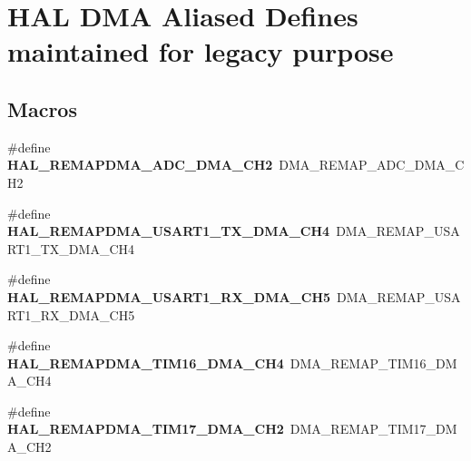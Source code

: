 \hypertarget{group___h_a_l___d_m_a___aliased___defines}{\section{H\-A\-L D\-M\-A Aliased Defines maintained for legacy purpose}
\label{group___h_a_l___d_m_a___aliased___defines}
}
\subsection*{Macros}
\begin{DoxyCompactItemize}
\item 
\hypertarget{group___h_a_l___d_m_a___aliased___defines_gab67dabe51720b5e84e798243b52428c7}{\#define {\bfseries H\-A\-L\-\_\-\-R\-E\-M\-A\-P\-D\-M\-A\-\_\-\-A\-D\-C\-\_\-\-D\-M\-A\-\_\-\-C\-H2}~D\-M\-A\-\_\-\-R\-E\-M\-A\-P\-\_\-\-A\-D\-C\-\_\-\-D\-M\-A\-\_\-\-C\-H2}\label{group___h_a_l___d_m_a___aliased___defines_gab67dabe51720b5e84e798243b52428c7}

\item 
\hypertarget{group___h_a_l___d_m_a___aliased___defines_ga9f990969f0752e658ca3b1ca5fef46b8}{\#define {\bfseries H\-A\-L\-\_\-\-R\-E\-M\-A\-P\-D\-M\-A\-\_\-\-U\-S\-A\-R\-T1\-\_\-\-T\-X\-\_\-\-D\-M\-A\-\_\-\-C\-H4}~D\-M\-A\-\_\-\-R\-E\-M\-A\-P\-\_\-\-U\-S\-A\-R\-T1\-\_\-\-T\-X\-\_\-\-D\-M\-A\-\_\-\-C\-H4}\label{group___h_a_l___d_m_a___aliased___defines_ga9f990969f0752e658ca3b1ca5fef46b8}

\item 
\hypertarget{group___h_a_l___d_m_a___aliased___defines_gaee098de174f870c95b0853e34dddd92b}{\#define {\bfseries H\-A\-L\-\_\-\-R\-E\-M\-A\-P\-D\-M\-A\-\_\-\-U\-S\-A\-R\-T1\-\_\-\-R\-X\-\_\-\-D\-M\-A\-\_\-\-C\-H5}~D\-M\-A\-\_\-\-R\-E\-M\-A\-P\-\_\-\-U\-S\-A\-R\-T1\-\_\-\-R\-X\-\_\-\-D\-M\-A\-\_\-\-C\-H5}\label{group___h_a_l___d_m_a___aliased___defines_gaee098de174f870c95b0853e34dddd92b}

\item 
\hypertarget{group___h_a_l___d_m_a___aliased___defines_ga4ff45d813656296b6f9226f333a22fc3}{\#define {\bfseries H\-A\-L\-\_\-\-R\-E\-M\-A\-P\-D\-M\-A\-\_\-\-T\-I\-M16\-\_\-\-D\-M\-A\-\_\-\-C\-H4}~D\-M\-A\-\_\-\-R\-E\-M\-A\-P\-\_\-\-T\-I\-M16\-\_\-\-D\-M\-A\-\_\-\-C\-H4}\label{group___h_a_l___d_m_a___aliased___defines_ga4ff45d813656296b6f9226f333a22fc3}

\item 
\hypertarget{group___h_a_l___d_m_a___aliased___defines_ga4f0dcd990b13d8fd3de0ed0bfd6be555}{\#define {\bfseries H\-A\-L\-\_\-\-R\-E\-M\-A\-P\-D\-M\-A\-\_\-\-T\-I\-M17\-\_\-\-D\-M\-A\-\_\-\-C\-H2}~D\-M\-A\-\_\-\-R\-E\-M\-A\-P\-\_\-\-T\-I\-M17\-\_\-\-D\-M\-A\-\_\-\-C\-H2}\label{group___h_a_l___d_m_a___aliased___defines_ga4f0dcd990b13d8fd3de0ed0bfd6be555}


\end{DoxyCompactItemize}
